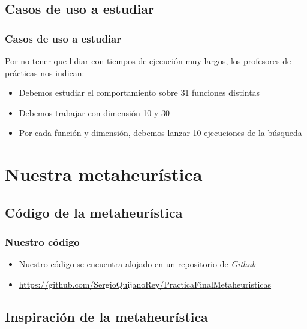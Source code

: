 \documentclass{beamer}
\begin{document}
\subsection{Casos de uso a estudiar}
\begin{frame}
\frametitle{Casos de uso a estudiar}

Por no tener que lidiar con tiempos de ejecución muy largos, los profesores de prácticas nos indican:

\begin{itemize}
    \item Debemos estudiar el comportamiento sobre 31 funciones distintas
    \item Debemos trabajar con dimensión 10 y 30
    \item Por cada función y dimensión, debemos lanzar 10 ejecuciones de la búsqueda
\end{itemize}
\end{frame}

\section{Nuestra metaheurística}

\subsection{Código de la metaheurística}
\begin{frame}
    \frametitle{Nuestro código}
    \begin{itemize}
        \item Nuestro código se encuentra alojado en un repositorio de \emph{Github}
        \item \url{https://github.com/SergioQuijanoRey/PracticaFinalMetaheuristicas}
    \end{itemize}
\end{frame}

\subsection{Inspiración de la metaheurística}
\end{document}

